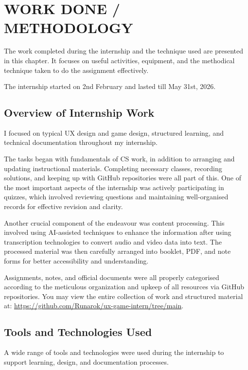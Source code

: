 \documentclass[12pt,a4paper]{report}
\begin{document}
\chapter{WORK DONE / METHODOLOGY}

The work completed during the internship and the technique used are presented in this chapter. It focuses on useful activities, equipment, and the methodical technique taken to do the assignment effectively.

The internship started on 2nd February and lasted till May 31st, 2026.

\section{Overview of Internship Work}
I focused on typical UX design and game design, structured learning, and technical documentation throughout my internship.

The tasks began with fundamentals of CS work, in addition to arranging and updating instructional materials. Completing necessary classes, recording solutions, and keeping up with GitHub repositories were all part of this. One of the most important aspects of the internship was actively participating in quizzes, which involved reviewing questions and maintaining well-organised records for effective revision and clarity.

Another crucial component of the endeavour was content processing. This involved using AI-assisted techniques to enhance the information after using transcription technologies to convert audio and video data into text. The processed material was then carefully arranged into booklet, PDF, and note forms for better accessibility and understanding.

Assignments, notes, and official documents were all properly categorised according to the meticulous organization and upkeep of all resources via GitHub repositories. You may view the entire collection of work and structured material at: \url{https://github.com/Runarok/ux-game-intern/tree/main}.

\section{Tools and Technologies Used}
A wide range of tools and technologies were used during the internship to support learning, design, and documentation processes.

\end{document}
